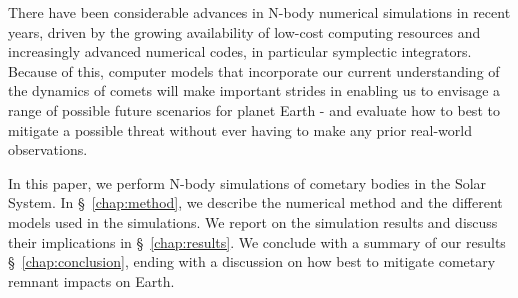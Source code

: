 There have been considerable advances in N-body numerical simulations in recent years, driven by the growing availability of low-cost computing resources and increasingly advanced numerical codes, in particular symplectic integrators. Because of this, computer models that incorporate our current understanding of the dynamics of comets will make important strides in enabling us to envisage a range of possible future scenarios for planet Earth - and evaluate how to best to mitigate a possible threat without ever having to make any prior real-world observations.


In this paper, we perform N-body simulations of cometary bodies in the Solar System. In \S~\ref{chap:method}, we describe the numerical method and the different models used in the simulations. We report on the simulation results and discuss their implications in \S~\ref{chap:results}. We conclude with a summary of our results \S~\ref{chap:conclusion}, ending with a discussion on how best to mitigate cometary remnant impacts on Earth.
